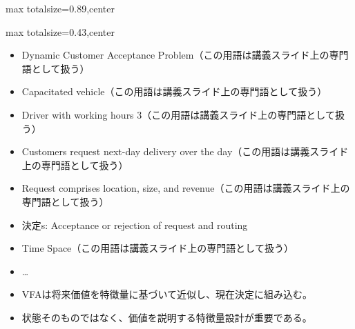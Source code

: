 \begin{minipage}[t]{0.58\textwidth}
\begin{adjustbox}{max totalsize={\textwidth}{0.89\textheight},center}
\begin{minipage}{\textwidth}
\end{minipage}
\end{adjustbox}
\end{minipage}


\clearpage
{}
\begin{minipage}[t]{0.405\textwidth}
\begin{adjustbox}{max totalsize={\textwidth}{0.43\textheight},center}
\begin{minipage}{\textwidth}\scriptsize
{}\begin{itemize}
\item Dynamic Customer Acceptance Problem（この用語は講義スライド上の専門語として扱う）
\item Capacitated vehicle（この用語は講義スライド上の専門語として扱う）
\item Driver with working hours 3（この用語は講義スライド上の専門語として扱う）
\item Customers request next-day delivery over the day（この用語は講義スライド上の専門語として扱う）
\item Request comprises location, size, and revenue（この用語は講義スライド上の専門語として扱う）
\item 決定s: Acceptance or rejection of request and routing
\item Time Space（この用語は講義スライド上の専門語として扱う）
\item …
\end{itemize}\begin{itemize}
\item VFAは将来価値を特徴量に基づいて近似し、現在決定に組み込む。
\item 状態そのものではなく、価値を説明する特徴量設計が重要である。
\end{itemize}
\end{minipage}
\end{adjustbox}
\end{minipage}\hfill

